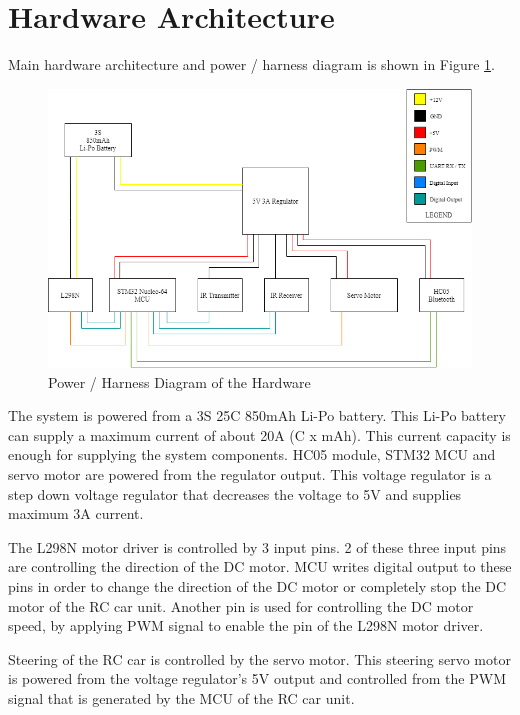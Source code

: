 \section{Hardware Architecture} \label{sec_hardware_design}

Main hardware architecture and power / harness diagram is shown in Figure \ref{fig:hardware_architecture}. 

\begin{figure}[!htbp]
    \centering
    \includegraphics[width=1\textwidth]{Imgs/ana_devre_v3.png}
    \caption{\label{fig:hardware_architecture}Power / Harness Diagram of the Hardware}
\end{figure}

The system is powered from a 3S 25C 850mAh Li-Po battery. This Li-Po battery can supply a maximum current of about 20A (C x mAh). This current capacity is enough for supplying the system components. HC05 module, STM32 MCU and servo motor are powered from the regulator output. This voltage regulator is a step down voltage regulator that decreases the voltage to 5V and supplies maximum 3A current.

The L298N motor driver is controlled by 3 input pins. 2 of these three input pins are controlling the direction of the DC motor. MCU writes digital output to these pins in order to change the direction of the DC motor or completely stop the DC motor of the RC car unit. Another pin is used for controlling the DC motor speed, by applying PWM signal to enable the pin of the L298N motor driver. 

Steering of the RC car is controlled by the servo motor. This steering servo motor is powered from the voltage regulator’s 5V output and controlled from the PWM signal that is generated by the MCU of the RC car unit. 

